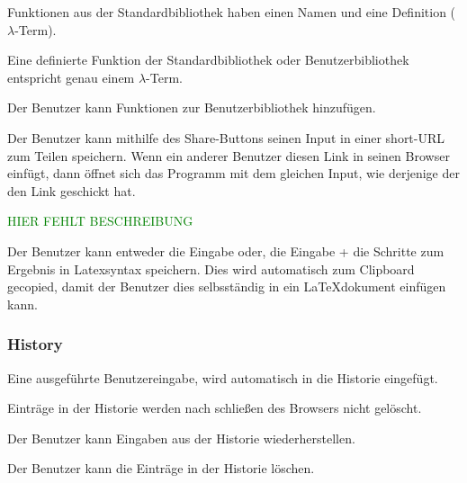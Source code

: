 \documentclass[parskip=full,11pt,twoside]{scrartcl}
\begin{document}
Funktionen aus der Standardbibliothek haben einen Namen und eine Definition ($\lambda$-Term).

Eine definierte Funktion der Standardbibliothek oder Benutzerbibliothek entspricht genau einem $\lambda$-Term.

Der Benutzer kann Funktionen zur Benutzerbibliothek hinzufügen.


Der Benutzer kann mithilfe des Share-Buttons seinen Input in einer short-URL zum Teilen speichern. Wenn ein anderer Benutzer diesen Link in seinen Browser einfügt, dann öffnet sich das Programm mit dem gleichen Input, wie derjenige der den Link geschickt hat.

\textcolor{green}{HIER FEHLT BESCHREIBUNG}

Der Benutzer kann entweder die Eingabe oder, die Eingabe + die Schritte zum Ergebnis in Latexsyntax speichern. Dies wird automatisch zum Clipboard gecopied, damit der Benutzer dies selbsständig in ein LaTeXdokument einfügen kann.





\subsubsection{History}
Eine ausgeführte Benutzereingabe, wird automatisch in die Historie eingefügt.

Einträge in der Historie werden nach schließen des Browsers nicht gelöscht.

Der Benutzer kann Eingaben aus der Historie wiederherstellen.

Der Benutzer kann die Einträge in der Historie löschen.
\end{document}
